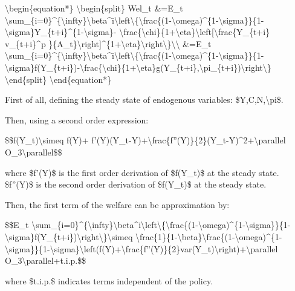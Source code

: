 \documentclass[10pt,math=newtx,citestyle=gb7714-2015,bibstyle=gb7714-2015]{elegantbook}
\begin{document}
	\textbackslash{}begin\{equation*\}
	\textbackslash{}begin\{split\}
	Wel\_t \&=E\_t \textbackslash{}sum\_\{i=0\}\^{}\{\textbackslash{}infty\}\textbackslash{}beta\^{}i\textbackslash{}left\textbackslash{}\{\textbackslash{}frac\{(1-\textbackslash{}omega)\^{}\{1-\textbackslash{}sigma\}\}\{1-\textbackslash{}sigma\}Y\_\{t+i\}\^{}\{1-\textbackslash{}sigma\}- \textbackslash{}frac\{\textbackslash{}chi\}\{1+\textbackslash{}eta\}\textbackslash{}left[\textbackslash{}frac\{Y\_\{t+i\} v\_\{t+i\}\^{}p \}\{A\_t\}\textbackslash{}right]\^{}\{1+\textbackslash{}eta\}\textbackslash{}right\textbackslash{}\}\textbackslash{}\textbackslash{}
	\&=E\_t \textbackslash{}sum\_\{i=0\}\^{}\{\textbackslash{}infty\}\textbackslash{}beta\^{}i\textbackslash{}left\textbackslash{}\{\textbackslash{}frac\{(1-\textbackslash{}omega)\^{}\{1-\textbackslash{}sigma\}\}\{1-\textbackslash{}sigma\}f(Y\_\{t+i\})-\textbackslash{}frac\{\textbackslash{}chi\}\{1+\textbackslash{}eta\}g(Y\_\{t+i\},\textbackslash{}pi\_\{t+i\})\textbackslash{}right\textbackslash{}\}
	\textbackslash{}end\{split\}
	\textbackslash{}end\{equation*\}
	
	First of all, defining the steady state of endogenous variables: \$Y,C,N,\textbackslash{}pi\$.
	
	Then, using a second order expression:
	
	\$\$f(Y\_t)\textbackslash{}simeq f(Y)+ f'(Y)(Y\_t-Y)+\textbackslash{}frac\{f''(Y)\}\{2\}(Y\_t-Y)\^{}2+\textbackslash{}parallel O\_3\textbackslash{}parallel\$\$
	
	where \$f'(Y)\$ is the first order derivation of \$f(Y\_t)\$ at the steady state. \$f''(Y)\$ is the second order derivation of \$f(Y\_t)\$ at the steady state.
	
	Then, the first term of the welfare can be approximation by:
	
	\$\$E\_t \textbackslash{}sum\_\{i=0\}\^{}\{\textbackslash{}infty\}\textbackslash{}beta\^{}i\textbackslash{}left\textbackslash{}\{\textbackslash{}frac\{(1-\textbackslash{}omega)\^{}\{1-\textbackslash{}sigma\}\}\{1-\textbackslash{}sigma\}f(Y\_\{t+i\})\textbackslash{}right\textbackslash{}\}\textbackslash{}simeq \textbackslash{}frac\{1\}\{1-\textbackslash{}beta\}\textbackslash{}frac\{(1-\textbackslash{}omega)\^{}\{1-\textbackslash{}sigma\}\}\{1-\textbackslash{}sigma\}\textbackslash{}left(f(Y)+\textbackslash{}frac\{f''(Y)\}\{2\}var(Y\_t)\textbackslash{}right)+\textbackslash{}parallel O\_3\textbackslash{}parallel+t.i.p.\$\$
	
	where \$t.i.p.\$ indicates terms independent of the policy.
	
\end{document}
